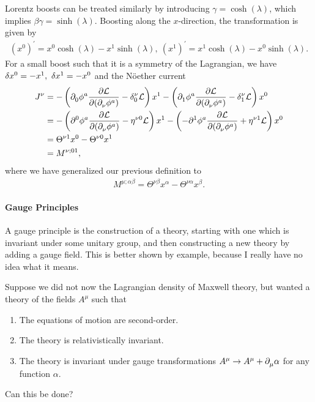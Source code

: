 Lorentz boosts can be treated similarly by introducing $\gamma = \cosh(\lambda)$, which implies $\beta\gamma = \sinh(\lambda)$. Boosting along the $x$-direction, the transformation is given by
\begin{align*}
	(x^{0})^{\prime} = x^{0}\cosh(\lambda) - x^{1}\sinh(\lambda),\ (x^{1})^{\prime} = x^{1}\cosh(\lambda) - x^{0}\sinh(\lambda).
\end{align*}
For a small boost such that it is a symmetry of the Lagrangian, we have $\var{x^{0}} = - x^{1},\ \var{x^{1}} = -x^{0}$ and the Nöether current
\begin{align*}
	J^{\nu} &= -\left(\del{0}{\phi^{a}}\pdv{\lag}{(\del{\nu}{\phi^{a}})} - \kdelta{0}{\nu}\lag\right)x^{1} - \left(\del{1}{\phi^{a}}\pdv{\lag}{(\del{\nu}{\phi^{a}})} - \kdelta{1}{\nu}\lag\right)x^{0} \\
	        &= -\left(\del[0]{}{\phi^{a}}\pdv{\lag}{(\del{\nu}{\phi^{a}})} - \eta^{\nu 0}\lag\right)x^{1} - \left(-\del[1]{}{\phi^{a}}\pdv{\lag}{(\del{\nu}{\phi^{a}})} + \eta^{\nu 1}\lag\right)x^{0} \\
	        &= \Theta^{\nu 1}x^{0} - \Theta^{\nu 0}x^{1} \\
	        &= M^{\nu;01},
\end{align*}
where we have generalized our previous definition to
\begin{align*}
	M^{\mu;\alpha\beta} = \Theta^{\nu\beta}x^{\alpha} - \Theta^{\nu\alpha}x^{\beta}.
\end{align*}

\paragraph{Gauge Principles}
A gauge principle is the construction of a theory, starting with one which is invariant under some unitary group, and then constructing a new theory by adding a gauge field. This is better shown by example, because I really have no idea what it means.

Suppose we did not now the Lagrangian density of Maxwell theory, but wanted a theory of the fields $A^{\mu}$ such that
\begin{enumerate}
	\item The equations of motion are second-order.
	\item The theory is relativistically invariant.
	\item The theory is invariant under gauge transformations $A^{\mu}\to A^{\mu} + \del{\mu}{\alpha}$ for any function $\alpha$.
\end{enumerate}
Can this be done?

